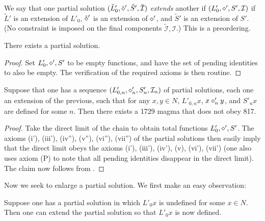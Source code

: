 \begin{definition}
We say that one partial solution $(\tilde L'_0, \tilde {\diamond}', \tilde S', \tilde {\mathcal I})$ \emph{extends} another if $(L'_0, \diamond', S',  {\mathcal I})$ if $\tilde L'$ is an extension of $L'_0$, $\tilde {\diamond}'$ is an extension of $\diamond'$, and $\tilde S'$ is an extension of $S'$.  (No constraint is imposed on the final components $\tilde {\mathcal I}, {\mathcal I}$.)  This is a preordering.
\end{definition}

\begin{lemma}\label{partial-exist}\leanok  There exists a partial solution.
\end{lemma}

\begin{proof}\leanok Set $L'_0, \diamond', S'$ to be empty functions, and have the set of pending identities to also be empty.  The verification of the required axioms is then routine.
\end{proof}

\begin{lemma}\label{chain}\leanok  Suppose that one has a sequence
$(L'_{0,n}, \diamond'_{n}, S'_{n}, {\mathcal I}_n)$ of partial solutions, each one an extension of the previous, such that for any $x, y \in N$, $L'_{0,n} x$, $x \diamond'_{n} y$, and $S'_n x$ are defined for some $n$.  Then there exists a 1729 magma that does not obey 817.
\end{lemma}

\begin{proof}\leanok  Take the direct limit of the chain to obtain total functions $L'_0, \diamond', S'$.  The axioms (i'), (iii'), (iv''), (v''), (vi''), (vii'') of the partial solutions then easily imply that the direct limit obeys the axioms (i'), (iii'), (iv'), (v), (vi'), (vii') (one also uses axiom (P) to note that all pending identities disappear in the direct limit). The claim now follows from .
\end{proof}


Now we seek to enlarge a partial solution. We first make an easy observation:

\begin{proposition}[Enlarging $L'_0$]\label{enlarge-l0}\leanok  Suppose one has a partial solution in which $L'_0 x$ is undefined for some $x \in N$.  Then one can extend the partial solution so that $L'_0 x$ is now defined.
\end{proposition}

